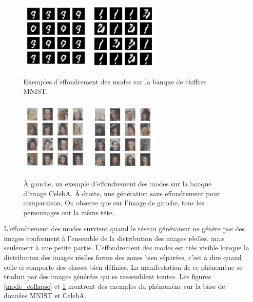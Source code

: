 \begin{figure}[!h]
\centering
\includegraphics[width=100pt]{"images/GAN/collapseA_1"}
\includegraphics[width=100pt]{"images/GAN/collapseA_2"}
\caption{Exemples d’effondrement des modes sur la banque de chiffres MNIST.}
\label{mode_collapse}
\includegraphics[width=100pt]{"images/GAN/collapseB_1"}
\includegraphics[width=100pt]{"images/GAN/collapseB_2"}
\caption{À gauche, un exemple d'effondrement des modes sur la banque d'image CelebA. À droite, une génération sans effondrement pour comparaison. On observe que sur l'image de gauche, tous les personnages ont la même tête.}
\label{mode_collapse_celeb}
\end{figure}


L'effondrement des modes survient quand le réseau générateur ne génère pas des images conforment à l'ensemble de la distribution des images réelles, mais seulement à une petite partie. L'effondrement des modes est très visible lorsque la distribution des images réelles forme des zones bien séparées, c'est à dire quand celle-ci comporte des classes bien définies. La manifestation de ce phénomène se traduit par des images générées qui se ressemblent toutes. Les figures \ref{mode_collapse} et \ref{mode_collapse_celeb} montrent des exemples du phénomène sur la base de données MNIST et CelebA.


